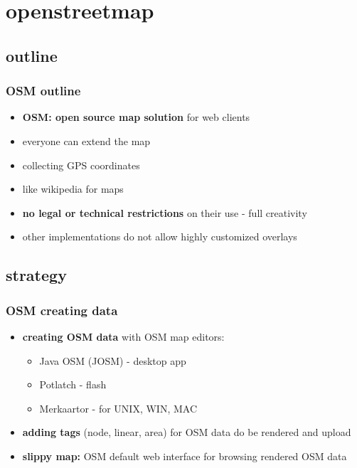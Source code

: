 \documentclass[blue]{beamer}
\begin{document}

\section{openstreetmap}
\subsection{outline}
\frame
{
\frametitle{\textbf{OSM outline}}
\begin{itemize}
	\item \textbf{OSM: open source map solution} for web clients
	\item everyone can extend the map
	\item collecting GPS coordinates
	\item like wikipedia for maps
	\item \textbf{no legal or technical restrictions} on their use - full creativity
	\item other implementations do not allow highly customized overlays
\end{itemize}
}

\subsection{strategy}
\frame
{
\frametitle{\textbf{OSM creating data}}
\begin{itemize}
	\item \textbf{creating OSM data} with OSM map editors:
	\begin{itemize}
			\item Java OSM (JOSM) - desktop app
			\item Potlatch - flash
			\item Merkaartor - for UNIX, WIN, MAC
	\end{itemize}
	\item \textbf{adding tags} (node, linear, area) for OSM data do be rendered and upload
	\item \textbf{slippy map:} OSM default web interface for browsing rendered OSM data
\end{itemize}
}
\end{document}
